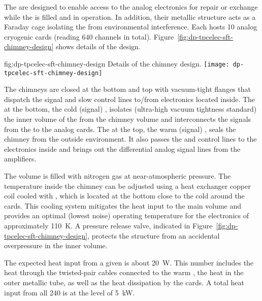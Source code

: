 The  are designed to enable access to the  analog electronics for repair or exchange while the  is filled and in operation. In addition, their metallic structure acts as a Faraday cage isolating the   from environmental interference.  Each  hosts \num{10} analog cryogenic  cards (reading \num{640} channels in total). Figure~\ref{fig:dp-tpcelec-sft-chimney-design} shows details of the design. 

\begin{dunefigure}{fig:dp-tpcelec-sft-chimney-design}
{Details of the  chimney design.}
\texttt{[image: dp-tpcelec-sft-chimney-design]}
\end{dunefigure}

The chimneys are closed at the bottom and top with vacuum-tight \fdth flanges that dispatch the signal and slow control lines to/from  electronics located inside. The \fdth at the bottom, the cold (signal) \fdth, isolates (ultra-high vacuum tightness standard) the inner volume of the  from the chimney volume and interconnects the signals from the  to the analog  cards. The \fdth at the top, the warm (signal) \fdth, seals the chimney from the outside environment. It also passes the  and control lines to the  electronics inside and brings out the differential analog signal lines from the  amplifiers. 

The  volume is filled with nitrogen gas at near-atmospheric pressure. The temperature inside the chimney can be adjusted using a heat exchanger copper coil cooled with \lar, which is located at the bottom close to the cold \fdth around the  cards. This cooling system mitigates the heat input to the main  volume and provides an optimal (lowest noise) operating temperature for the  electronics of approximately \SI{110}{K}. A pressure release valve, indicated in Figure~\ref{fig:dp-tpcelec-sft-chimney-design}, protects the structure from an accidental overpressure in the inner volume. 

The expected heat input from a given  is about \SI{20}{\watt}. This number includes the heat through the twisted-pair cables connected to the warm \fdth, the heat in the   outer metallic tube, as well as the heat dissipation by the  cards. A total heat input from all \num{240}  is at the level of \SI{5}{\kilo\watt}. 


